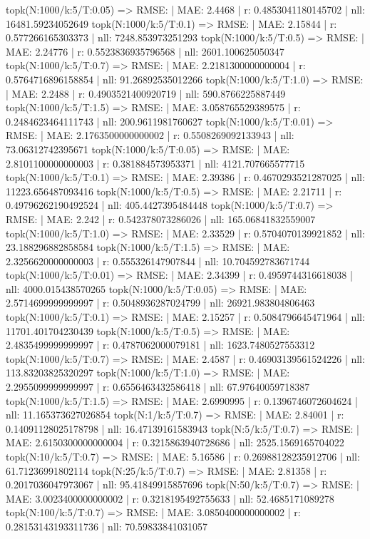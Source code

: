 topk(N:1000/k:5/T:0.05) => RMSE: | MAE: 2.4468 | r: 0.4853041180145702 | nll: 16481.59234052649
topk(N:1000/k:5/T:0.1) => RMSE: | MAE: 2.15844 | r: 0.577266165303373 | nll: 7248.853973251293
topk(N:1000/k:5/T:0.5) => RMSE: | MAE: 2.24776 | r: 0.5523836935796568 | nll: 2601.100625050347
topk(N:1000/k:5/T:0.7) => RMSE: | MAE: 2.2181300000000004 | r: 0.5764716896158854 | nll: 91.26892535012266
topk(N:1000/k:5/T:1.0) => RMSE: | MAE: 2.2488 | r: 0.4903521400920719 | nll: 590.8766225887449
topk(N:1000/k:5/T:1.5) => RMSE: | MAE: 3.058765529389575 | r: 0.2484623464111743 | nll: 200.9611981760627
topk(N:1000/k:5/T:0.01) => RMSE: | MAE: 2.1763500000000002 | r: 0.5508269092133943 | nll: 73.06312742395671
topk(N:1000/k:5/T:0.05) => RMSE: | MAE: 2.8101100000000003 | r: 0.381884573953371 | nll: 4121.707665577715
topk(N:1000/k:5/T:0.1) => RMSE: | MAE: 2.39386 | r: 0.4670293521287025 | nll: 11223.656487093416
topk(N:1000/k:5/T:0.5) => RMSE: | MAE: 2.21711 | r: 0.49796262190492524 | nll: 405.4427395484448
topk(N:1000/k:5/T:0.7) => RMSE: | MAE: 2.242 | r: 0.542378073286026 | nll: 165.06841832559007
topk(N:1000/k:5/T:1.0) => RMSE: | MAE: 2.33529 | r: 0.5704070139921852 | nll: 23.188296882858584
topk(N:1000/k:5/T:1.5) => RMSE: | MAE: 2.3256620000000003 | r: 0.555326147907844 | nll: 10.704592783671744
topk(N:1000/k:5/T:0.01) => RMSE: | MAE: 2.34399 | r: 0.4959744316618038 | nll: 4000.015438570265
topk(N:1000/k:5/T:0.05) => RMSE: | MAE: 2.5714699999999997 | r: 0.5048936287024799 | nll: 26921.983804806463
topk(N:1000/k:5/T:0.1) => RMSE: | MAE: 2.15257 | r: 0.5084796645471964 | nll: 11701.401704230439
topk(N:1000/k:5/T:0.5) => RMSE: | MAE: 2.4835499999999997 | r: 0.4787062000079181 | nll: 1623.7480527553312
topk(N:1000/k:5/T:0.7) => RMSE: | MAE: 2.4587 | r: 0.46903139561524226 | nll: 113.83203825320297
topk(N:1000/k:5/T:1.0) => RMSE: | MAE: 2.2955099999999997 | r: 0.6556463432586418 | nll: 67.97640059718387
topk(N:1000/k:5/T:1.5) => RMSE: | MAE: 2.6990995 | r: 0.1396746072604624 | nll: 11.165373627026854
topk(N:1/k:5/T:0.7) => RMSE: | MAE: 2.84001 | r: 0.14091128025178798 | nll: 16.47139161583943
topk(N:5/k:5/T:0.7) => RMSE: | MAE: 2.6150300000000004 | r: 0.3215863940728686 | nll: 2525.1569165704022
topk(N:10/k:5/T:0.7) => RMSE: | MAE: 5.16586 | r: 0.26988128235912706 | nll: 61.71236991802114
topk(N:25/k:5/T:0.7) => RMSE: | MAE: 2.81358 | r: 0.2017036047973067 | nll: 95.41849915857696
topk(N:50/k:5/T:0.7) => RMSE: | MAE: 3.0023400000000002 | r: 0.3218195492755633 | nll: 52.4685171089278
topk(N:100/k:5/T:0.7) => RMSE: | MAE: 3.0850400000000002 | r: 0.28153143193311736 | nll: 70.59833841031057
